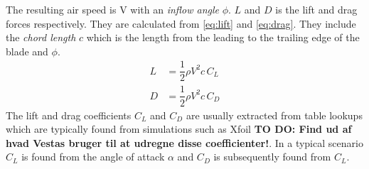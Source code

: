 The resulting air speed is V with an \textit{inflow angle} $ \phi $. $ L $ and $ D $ is the lift and drag forces respectively. They are calculated from \cref{eq:lift} and \cref{eq:drag}. They include the \textit{chord length} $ c $ which is the length from the leading to the trailing edge of the blade and $ \phi $.
\begin{align}
	L &= \dfrac{1}{2} \rho V^2 c \, C_L \label{eq:lift}\\
	D &= \dfrac{1}{2} \rho V^2 c \, C_D \label{eq:drag}
\end{align}
The lift and drag coefficients $ C_L $ and $ C_D $ are usually extracted from table lookups which are typically found from simulations such as Xfoil \textbf{TO DO: Find ud af hvad Vestas bruger til at udregne disse coefficienter!}. In a typical scenario $ C_L $ is found from the angle of attack $ \alpha $ and $ C_D $ is subsequently found from $ C_L $.